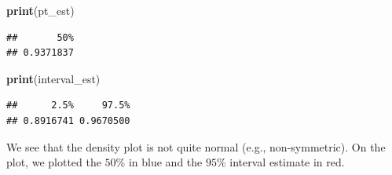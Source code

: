 \documentclass[
]{article}
\newenvironment{Shaded}{\begin{snugshade}}{\end{snugshade}}
\newcommand{\FunctionTok}[1]{\textcolor[rgb]{0.13,0.29,0.53}{\textbf{#1}}}
\newcommand{\NormalTok}[1]{#1}
\begin{document}
\begin{Shaded}
\begin{Highlighting}[]
\FunctionTok{print}\NormalTok{(pt\_est)}
\end{Highlighting}
\end{Shaded}

\begin{verbatim}
##       50% 
## 0.9371837
\end{verbatim}

\begin{Shaded}
\begin{Highlighting}[]
\FunctionTok{print}\NormalTok{(interval\_est)}
\end{Highlighting}
\end{Shaded}

\begin{verbatim}
##      2.5%     97.5% 
## 0.8916741 0.9670500
\end{verbatim}

We see that the density plot is not quite normal (e.g., non-symmetric).
On the plot, we plotted the \(50\%\) in blue and the \(95\%\) interval
estimate in red.
\end{document}
